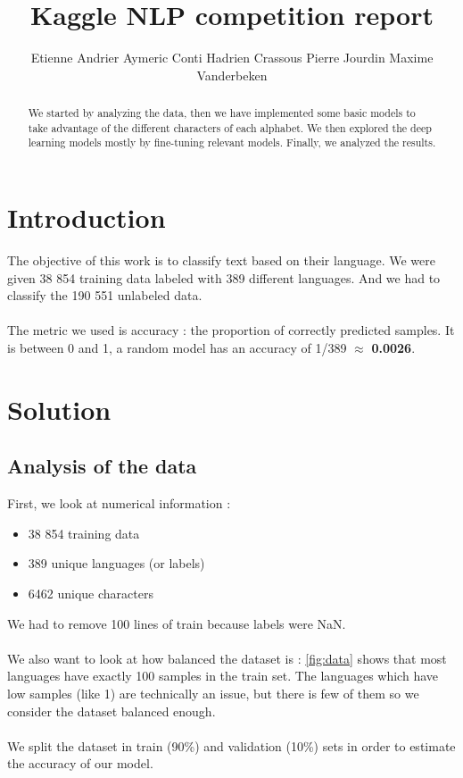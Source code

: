 \documentclass[11pt]{article}
\title{Kaggle NLP competition report}
\author{Etienne Andrier \And Aymeric Conti \And Hadrien Crassous \AND Pierre Jourdin \And Maxime Vanderbeken}
\begin{document}
\maketitle
\begin{abstract}
We started by analyzing the data, then we have implemented some basic models to take advantage of the different characters of each alphabet. We then explored the deep learning models mostly by fine-tuning relevant models. Finally, we analyzed the results.
\end{abstract}

\section{Introduction}

The objective of this work is to classify text based on their language. We were given 38 854 training data labeled with 389 different languages. And we had to classify the 190 551 unlabeled data.
\\
\\
The metric we used is accuracy : the proportion of correctly predicted samples. It is between 0 and 1, a random model has an accuracy of 1/389 $\approx$ \textbf{0.0026}.

\section{Solution}

\subsection{Analysis of the data}
First, we look at numerical information :
\begin{itemize}[noitemsep, topsep=0pt]
    \item 38 854 training data
    \item 389 unique languages (or labels)
    \item 6462 unique characters
\end{itemize}
We had to remove 100 lines of train because labels were NaN.
\\\\
We also want to look at how balanced the dataset is : \autoref{fig:data} shows that most languages have exactly 100 samples in the train set. The languages which have low samples (like 1) are technically an issue, but there is few of them so we consider the dataset balanced enough.
\\\\
We split the dataset in train (90\%) and validation (10\%) sets in order to estimate the accuracy of our model.
\end{document}
